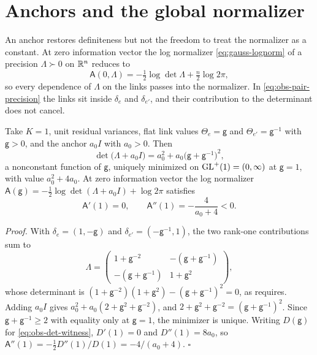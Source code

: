 \section{Anchors and the global normalizer}
\label{sec:obs-selfprior}

An anchor restores definiteness but not the freedom to treat the normalizer as a
constant. At zero information vector the log normalizer \eqref{eq:gauss-lognorm} of a
precision \(\Lambda\succ0\) on \(\mathbb R^n\) reduces to
\begin{equation}
\mathsf A(0,\Lambda)=-\tfrac12\log\det\Lambda+\tfrac n2\log2\pi,
\label{eq:obs-log-normalizer}
\end{equation}
so every dependence of \(\Lambda\) on the links passes into the normalizer. In
\eqref{eq:obs-pair-precision} the links sit inside \(\delta_e\) and \(\delta_{e'}\), and their
contribution to the determinant does not cancel.

Take \(K=1\), unit residual variances, flat link values \(\Theta_e=\mathsf g\) and
\(\Theta_{e'}=\mathsf g^{-1}\) with \(\mathsf g>0\), and the anchor \(a_0I\) with
\(a_0>0\). Then
\begin{equation}
\det\bigl(\Lambda+a_0I\bigr)=a_0^2+a_0\bigl(\mathsf g+\mathsf g^{-1}\bigr)^2,
\label{eq:obs-det-witness}
\end{equation}
a nonconstant function of \(\mathsf g\), uniquely minimized on \(\mathrm{GL}^+(1)=(0,\infty)\) at
\(\mathsf g=1\), with value \(a_0^2+4a_0\). At zero information vector the log normalizer
\(\mathsf A(\mathsf g)=-\tfrac12\log\det(\Lambda+a_0I)+\log2\pi\) satisfies
\begin{equation}
\mathsf A'(1)=0,
\qquad
\mathsf A''(1)=-\frac{4}{a_0+4}<0.
\label{eq:obs-normalizer-curvature}
\end{equation}

\noindent\emph{Proof.}
With \(\delta_e=(1,-\mathsf g)\) and \(\delta_{e'}=(-\mathsf g^{-1},1)\), the two rank-one
contributions sum to
\[
\Lambda=\begin{pmatrix}1+\mathsf g^{-2}&-(\mathsf g+\mathsf g^{-1})\\-(\mathsf g+\mathsf g^{-1})&1+\mathsf g^{2}\end{pmatrix},
\]
whose determinant is \((1+\mathsf g^{-2})(1+\mathsf g^2)-(\mathsf g+\mathsf g^{-1})^2=0\), as
 requires. Adding \(a_0I\) gives
\(a_0^2+a_0(2+\mathsf g^2+\mathsf g^{-2})\), and \(2+\mathsf g^2+\mathsf g^{-2}=(\mathsf g+\mathsf g^{-1})^2\).
Since \(\mathsf g+\mathsf g^{-1}\geq2\) with equality only at \(\mathsf g=1\), the minimizer is
unique. Writing \(D(\mathsf g)\) for \eqref{eq:obs-det-witness}, \(D'(1)=0\) and
\(D''(1)=8a_0\), so \(\mathsf A''(1)=-\tfrac12D''(1)/D(1)=-4/(a_0+4)\). \hfill$\square$

